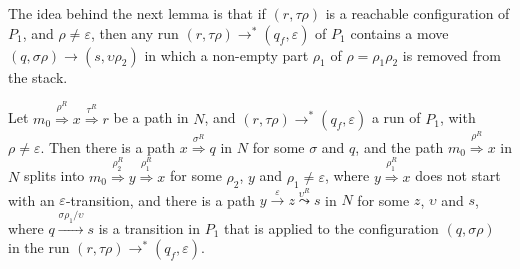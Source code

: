 \documentclass{llncs}
\newcommand{\eps}{\ensuremath{\varepsilon}}
\begin{document}
The idea behind the next lemma is that if $(r,\tau\rho)$ is a reachable configuration of $P_1$,
and $\rho\neq\eps$, then any run $(r,\tau\rho)\rightarrow^*(q_f,\eps)$ of $P_1$ contains a move
$(q,\sigma\rho)\rightarrow(s,\upsilon\rho_2)$ in which a non-empty part $\rho_1$ of $\rho=\rho_1\rho_2$ is removed from the stack.

\begin{lemma}
\label{lem:nfa3}
Let $m_0\stackrel{\rho^R}{\Rightarrow}x\stackrel{\tau^R}{\Rightarrow}r$ be a path in $N$, and
$(r,\tau\rho)\rightarrow^*(q_f,\eps)$ a run of $P_1$, with $\rho\neq\eps$.
Then there is a path $x\stackrel{\sigma^R}{\Rightarrow}q$ in $N$ for some $\sigma$ and $q$, and
the path $m_0\stackrel{\rho^R}{\Rightarrow}x$ in $N$ splits into
$m_0\stackrel{\rho_2^R}{\Rightarrow}y\stackrel{\rho_1^R}{\Rightarrow}x$ for some $\rho_2$, $y$ and $\rho_1\neq\eps$,
where $y\stackrel{\rho_1^R}{\Rightarrow}x$ does not start with an $\eps$-transition, and
there is a path $y\stackrel{\eps}{\rightarrow}z\stackrel{\upsilon^R}{\leadsto}s$ in $N$ for some $z$, $\upsilon$ and $s$,
where $q\stackrel{\sigma\rho_1/\upsilon}{\rightarrow}s$ is a transition in $P_1$
that is applied to the configuration $(q,\sigma\rho)$ in the run $(r,\tau\rho)\rightarrow^*(q_f,\eps)$.
\end{lemma}
\end{document}
